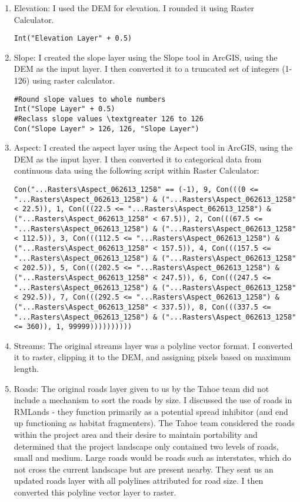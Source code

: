 \begin{enumerate}
    \item Elevation: I used the DEM for elevation. I rounded it using Raster Calculator.
\begin{lstlisting}
Int("Elevation Layer" + 0.5)
\end{lstlisting}

    \item Slope: I created the slope layer using the Slope tool in ArcGIS, using the DEM as the input layer. I then converted it to a truncated set of integers (1-126) using raster calculator.
\begin{lstlisting}
#Round slope values to whole numbers
Int("Slope Layer" + 0.5)
#Reclass slope values \textgreater 126 to 126
Con("Slope Layer" > 126, 126, "Slope Layer")
\end{lstlisting}

    \item Aspect: I created the aspect layer using the Aspect tool in ArcGIS, using the DEM as the input layer. I then converted it to categorical data from continuous data using the following script within Raster Calculator:
\lstset{language=SQL}
\begin{lstlisting}
Con("...Rasters\Aspect_062613_1258" == (-1), 9, Con(((0 <= "...Rasters\Aspect_062613_1258") & ("...Rasters\Aspect_062613_1258" < 22.5)), 1, Con(((22.5 <= "...Rasters\Aspect_062613_1258") & ("...Rasters\Aspect_062613_1258" < 67.5)), 2, Con(((67.5 <= "...Rasters\Aspect_062613_1258") & ("...Rasters\Aspect_062613_1258" < 112.5)), 3, Con(((112.5 <= "...Rasters\Aspect_062613_1258") & ("...Rasters\Aspect_062613_1258" < 157.5)), 4, Con(((157.5 <= "...Rasters\Aspect_062613_1258") & ("...Rasters\Aspect_062613_1258"< 202.5)), 5, Con(((202.5 <= "...Rasters\Aspect_062613_1258") & ("...Rasters\Aspect_062613_1258" < 247.5)), 6, Con(((247.5 <= "...Rasters\Aspect_062613_1258") & ("...Rasters\Aspect_062613_1258" < 292.5)), 7, Con(((292.5 <= "...Rasters\Aspect_062613_1258") & ("...Rasters\Aspect_062613_1258" < 337.5)), 8, Con(((337.5 <= "...Rasters\Aspect_062613_1258") & ("...Rasters\Aspect_062613_1258" <= 360)), 1, 99999))))))))))
\end{lstlisting}

    \item Streams: The original streams layer was a polyline vector format. I converted it to raster, clipping it to the DEM, and assigning pixels based on maximum length.

    \item Roads: The original roads layer given to us by the Tahoe team did not include a mechanism to sort the roads by size. I discussed the use of roads in RMLands - they function primarily as a potential spread inhibitor (and end up functioning as habitat fragmenters). The Tahoe team considered the roads within the project area and their desire to maintain portability and determined that the project landscape only contained two levels of roads, small and medium. Large roads would be roads such as interstates, which do not cross the current landscape but are present nearby. They sent us an updated roads layer with all polylines attributed for road size. I then converted this polyline vector layer to raster.


\end{enumerate}
